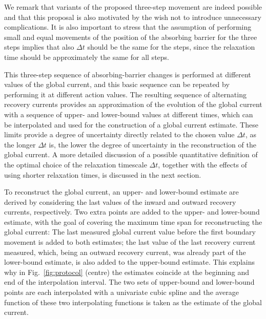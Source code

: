 We remark that variants of the proposed three-step movement are indeed possible and that this proposal is also motivated by the wish not to introduce unnecessary complications. It is also important to stress that the assumption of performing small and equal movements of the position of the absorbing barrier for the three steps implies that also $\Delta t$ should be the same for the steps, since the relaxation time should be approximately the same for all steps. 

This three-step sequence of absorbing-barrier changes is performed at different values of the global current, and this basic sequence can be repeated by performing it at different action values. The resulting sequence of alternating recovery currents provides an approximation of the evolution of the global current with a sequence of upper- and lower-bound values at different times, which can be interpolated and used for the construction of a global current estimate. These limits provide a degree of uncertainty directly related to the chosen value $\Delta t$, as the longer $\Delta t$ is, the lower the degree of uncertainty in the reconstruction of the global current. A more detailed discussion of a possible quantitative definition of the optimal choice of the relaxation timescale $\Delta t$, together with the effects of using shorter relaxation times, is discussed in the next section.

To reconstruct the global current, an upper- and lower-bound estimate are derived by considering the last values of the inward and outward recovery currents, respectively. Two extra points are added to the upper- and lower-bound estimate, with the goal of covering the maximum time span for reconstructing the global current: The last measured global current value before the first boundary movement is added to both estimates; the last value of the last recovery current measured, which, being an outward recovery current, was already part of the lower-bound estimate, is also added to the upper-bound estimate. This explains why in Fig.~\ref{fig:protocol} (centre) the estimates coincide at the beginning and end of the interpolation interval. The two sets of upper-bound and lower-bound points are each interpolated with a univariate cubic spline and the average function of these two interpolating functions is taken as the estimate of the global current. 


